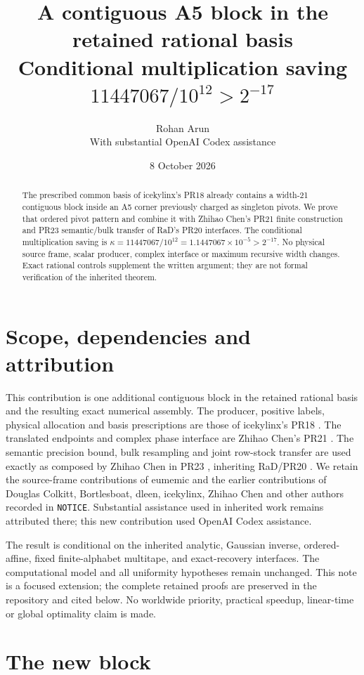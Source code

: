 \documentclass[11pt]{article}
\title{A contiguous A5 block in the retained rational basis\\
\large Conditional multiplication saving $11447067/10^{12}>2^{-17}$}
\author{Rohan Arun\\\small With substantial OpenAI Codex assistance}
\date{8 October 2026}
\begin{document}
\maketitle
\begin{abstract}
The prescribed common basis of icekylinx's PR18 already contains a
width-21 contiguous block inside an A5 corner previously charged as
singleton pivots. We prove that ordered pivot pattern and combine it
with Zhihao Chen's PR21 finite construction and PR23 semantic/bulk
transfer of RaD's PR20 interfaces. The conditional multiplication
saving is $\kappa=11447067/10^{12}=1.1447067\times10^{-5}>2^{-17}$.
No physical source frame, scalar producer, complex interface or maximum
recursive width changes. Exact rational controls supplement the written
argument; they are not formal verification of the inherited theorem.
\end{abstract}

\section{Scope, dependencies and attribution}
This contribution is one additional contiguous block in the retained
rational basis and the resulting exact numerical assembly. The producer,
positive labels, physical allocation and basis prescriptions are those of
icekylinx's PR18 \cite{pr18}. The translated endpoints and complex phase
interface are Zhihao Chen's PR21 \cite{pr21}. The semantic precision bound,
bulk resampling and joint row-stock transfer are used exactly as composed
by Zhihao Chen in PR23 \cite{pr23}, inheriting RaD/PR20 \cite{pr20}.
We retain the source-frame contributions of eumemic and the earlier
contributions of Douglas Colkitt, Bortlesboat, dleen, icekylinx, Zhihao Chen
and other authors recorded in \texttt{NOTICE}. Substantial assistance used
in inherited work remains attributed there; this new contribution used
OpenAI Codex assistance.

The result is conditional on the inherited analytic, Gaussian inverse,
ordered-affine, fixed finite-alphabet multitape, and exact-recovery
interfaces. The computational model and all uniformity hypotheses remain
unchanged. This note is a focused extension; the complete retained proofs
are preserved in the repository and cited below. No worldwide priority,
practical speedup, linear-time or global optimality claim is made.

\section{The new block}

\end{document}
